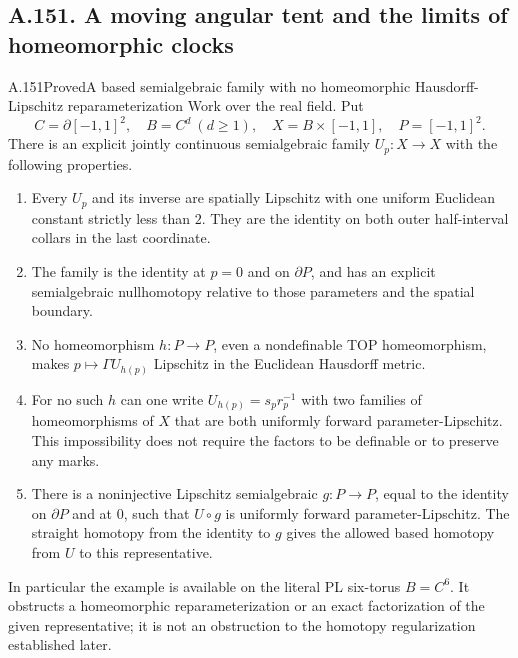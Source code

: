 \subsection{A.151. A moving angular tent and the limits of homeomorphic clocks}

\begin{saresult}{A.151}{Proved}{A based semialgebraic family with no homeomorphic Hausdorff-Lipschitz reparameterization}
Work over the real field. Put
\[
 C=\partial[-1,1]^2,\quad B=C^d\ (d\ge1),\quad
 X=B\times[-1,1],\quad P=[-1,1]^2.
\]
There is an explicit jointly continuous semialgebraic family
$U_p:X\to X$ with the following properties.
\begin{enumerate}
\item Every $U_p$ and its inverse are spatially Lipschitz with one
uniform Euclidean constant strictly less than $2$. They are the
identity on both outer half-interval collars in the last coordinate.
\item The family is the identity at $p=0$ and on $\partial P$, and
has an explicit semialgebraic nullhomotopy relative to those parameters
and the spatial boundary.
\item No homeomorphism $h:P\to P$, even a nondefinable TOP
homeomorphism, makes $p\mapsto\Gamma U_{h(p)}$ Lipschitz in the
Euclidean Hausdorff metric.
\item For no such $h$ can one write $U_{h(p)}=s_pr_p^{-1}$ with
two families of homeomorphisms of $X$ that are both uniformly
forward parameter-Lipschitz. This impossibility does not require
the factors to be definable or to preserve any marks.
\item There is a noninjective Lipschitz semialgebraic
$g:P\to P$, equal to the identity on $\partial P$ and at $0$,
such that $U\circ g$ is uniformly forward parameter-Lipschitz.
The straight homotopy from the identity to $g$ gives the allowed
based homotopy from $U$ to this representative.
\end{enumerate}
In particular the example is available on the literal PL six-torus
$B=C^6$. It obstructs a homeomorphic reparameterization or an exact
factorization of the given representative; it is not an obstruction
to the homotopy regularization established later.
\end{saresult}

